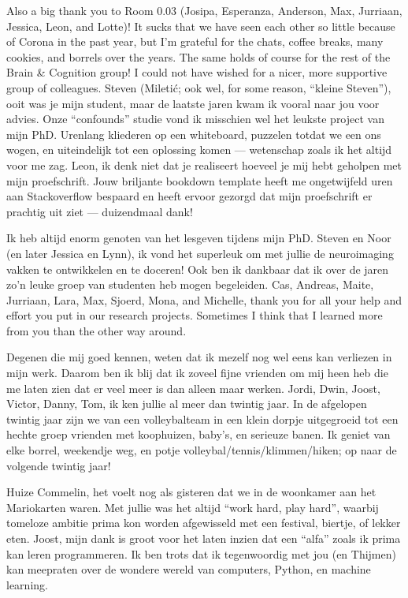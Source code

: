 \documentclass[12pt,american,a4paper,oneside,]{memoir} %
\begin{document}
Also a big thank you to Room 0.03 (Josipa, Esperanza, Anderson, Max, Jurriaan, Jessica, Leon, and Lotte)! It sucks that we have seen each other so little because of Corona in the past year, but I'm grateful for the chats, coffee breaks, many cookies, and borrels over the years. The same holds of course for the rest of the Brain \& Cognition group! I could not have wished for a nicer, more supportive group of colleagues. Steven (Miletić; ook wel, for some reason, ``kleine Steven''), ooit was je mijn student, maar de laatste jaren kwam ik vooral naar jou voor advies. Onze ``confounds'' studie vond ik misschien wel het leukste project van mijn PhD. Urenlang kliederen op een whiteboard, puzzelen totdat we een ons wogen, en uiteindelijk tot een oplossing komen --- wetenschap zoals ik het altijd voor me zag. Leon, ik denk niet dat je realiseert hoeveel je mij hebt geholpen met mijn proefschrift. Jouw briljante bookdown template heeft me ongetwijfeld uren aan Stackoverflow bespaard en heeft ervoor gezorgd dat mijn proefschrift er prachtig uit ziet --- duizendmaal dank!

Ik heb altijd enorm genoten van het lesgeven tijdens mijn PhD. Steven en Noor (en later Jessica en Lynn), ik vond het superleuk om met jullie de neuroimaging vakken te ontwikkelen en te doceren! Ook ben ik dankbaar dat ik over de jaren zo'n leuke groep van studenten heb mogen begeleiden. Cas, Andreas, Maite, Jurriaan, Lara, Max, Sjoerd, Mona, and Michelle, thank you for all your help and effort you put in our research projects. Sometimes I think that I learned more from you than the other way around.

Degenen die mij goed kennen, weten dat ik mezelf nog wel eens kan verliezen in mijn werk. Daarom ben ik blij dat ik zoveel fijne vrienden om mij heen heb die me laten zien dat er veel meer is dan alleen maar werken. Jordi, Dwin, Joost, Victor, Danny, Tom, ik ken jullie al meer dan twintig jaar. In de afgelopen twintig jaar zijn we van een volleybalteam in een klein dorpje uitgegroeid tot een hechte groep vrienden met koophuizen, baby's, en serieuze banen. Ik geniet van elke borrel, weekendje weg, en potje volleybal/tennis/klimmen/hiken; op naar de volgende twintig jaar!

Huize Commelin, het voelt nog als gisteren dat we in de woonkamer aan het Mariokarten waren. Met jullie was het altijd ``work hard, play hard'', waarbij tomeloze ambitie prima kon worden afgewisseld met een festival, biertje, of lekker eten. Joost, mijn dank is groot voor het laten inzien dat een ``alfa'' zoals ik prima kan leren programmeren. Ik ben trots dat ik tegenwoordig met jou (en Thijmen) kan meepraten over de wondere wereld van computers, Python, en machine learning.
\end{document}
